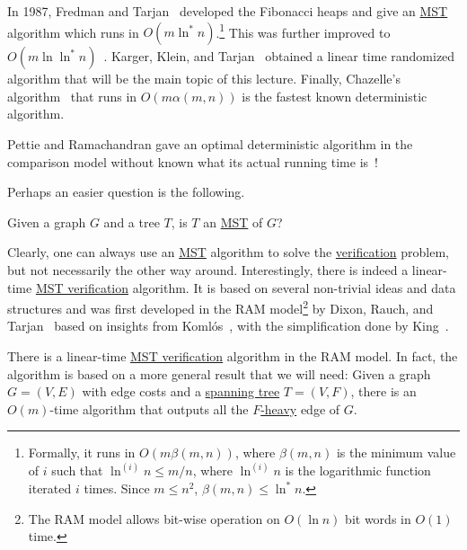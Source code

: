 In 1987, Fredman and Tarjan~\cite{fredman1987fibonacci} developed the Fibonacci heaps and give an \hyperref[prb:MST]{MST} algorithm which runs in \(O(m \ln ^{\ast} n)\).\footnote{Formally, it runs in \(O(m \beta (m, n))\), where \(\beta (m, n)\) is the minimum value of \(i\) such that \(\ln^{(i)} n \leq m / n\), where \(\ln ^{(i)} n\) is the logarithmic function iterated \(i\) times. Since \(m \leq n^2\), \(\beta (m, n) \leq \ln ^{\ast} n\).} This was further improved to \(O(m \ln \ln ^{\ast} n)\)~\cite{gabow1986efficient}. Karger, Klein, and Tarjan~\cite{karger1995randomized} obtained a linear time randomized algorithm that will be the main topic of this lecture. Finally, Chazelle's algorithm~\cite{chazelle2000minimum} that runs in \(O(m \alpha (m, n))\) is the fastest known deterministic algorithm.

\begin{note}
	Pettie and Ramachandran gave an optimal deterministic algorithm in the comparison model without known what its actual running time is~\cite{pettie2002optimal}!
\end{note}

Perhaps an easier question is the following.

\begin{problem}\label{prb:MST-verification}
Given a graph \(G\) and a tree \(T\), is \(T\) an \hyperref[prb:MST]{MST} of \(G\)?
\end{problem}

Clearly, one can always use an \hyperref[prb:MST]{MST} algorithm to solve the \hyperref[prb:MST-verification]{verification} problem, but not necessarily the other way around. Interestingly, there is indeed a linear-time \hyperref[prb:MST-verification]{MST verification} algorithm. It is based on several non-trivial ideas and data structures and was first developed in the RAM model\footnote{The RAM model allows bit-wise operation on \(O(\ln n)\) bit words in \(O(1)\) time.} by Dixon, Rauch, and Tarjan~\cite{dixon1992verification} based on insights from Komlós~\cite{komlos1985linear}, with the simplification done by King~\cite{king1997simpler}.

\begin{theorem}\label{thm:MST-verification}
	There is a linear-time \hyperref[prb:MST-verification]{MST verification} algorithm in the RAM model. In fact, the algorithm is based on a more general result that we will need: Given a graph \(G = (V, E)\) with edge costs and a \hyperref[def:spanning-tree]{spanning tree} \(T = (V, F)\), there is an \(O(m)\)-time algorithm that outputs all the \hyperref[def:heavy]{\(F\)-heavy} edge of \(G\).
\end{theorem}

